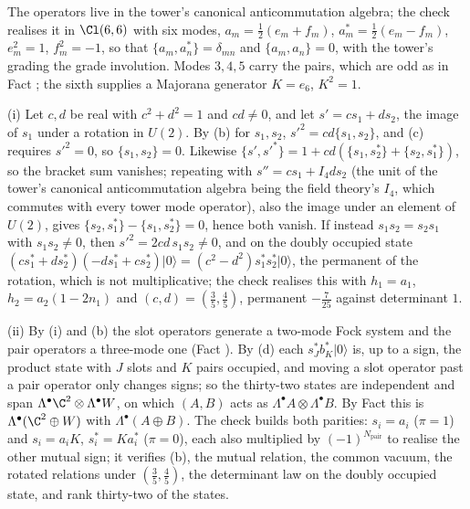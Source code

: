 The operators live in the tower's canonical anticommutation algebra; the check realises it in $\Cl(6,6)$ with six modes, $a_{m} = \tfrac12(e_{m} + f_{m})$, $a_{m}^{*} = \tfrac12(e_{m} - f_{m})$, $e_{m}^{2} = 1$, $f_{m}^{2} = -1$, so that $\{a_{m}, a_{n}^{*}\} = \delta_{mn}$ and $\{a_{m}, a_{n}\} = 0$, with the tower's grading the grade involution. Modes $3, 4, 5$ carry the pairs, which are odd as in Fact ; the sixth supplies a Majorana generator $K = e_{6}$, $K^{2} = 1$.

(i) Let $c, d$ be real with $c^{2} + d^{2} = 1$ and $cd \ne 0$, and let $s' = cs_{1} + ds_{2}$, the image of $s_{1}$ under a rotation in $U(2)$. By (b) for $s_{1}, s_{2}$, $s'^{2} = cd\{s_{1}, s_{2}\}$, and (c) requires $s'^{2} = 0$, so $\{s_{1}, s_{2}\} = 0$. Likewise $\{s', s'^{*}\} = 1 + cd(\{s_{1}, s_{2}^{*}\} + \{s_{2}, s_{1}^{*}\})$, so the bracket sum vanishes; repeating with $s'' = cs_{1} + I_{4} d s_{2}$ (the unit of the tower's canonical anticommutation algebra being the field theory's $I_{4}$, which commutes with every tower mode operator), also the image under an element of $U(2)$, gives $\{s_{2}, s_{1}^{*}\} - \{s_{1}, s_{2}^{*}\} = 0$, hence both vanish. If instead $s_{1}s_{2} = s_{2}s_{1}$ with $s_{1}s_{2} \neq 0$, then $s'^{2} = 2cd\,s_{1}s_{2} \neq 0$, and on the doubly occupied state $(cs_{1}^{*} + ds_{2}^{*})(-ds_{1}^{*} + cs_{2}^{*})\lvert 0 \rangle = (c^{2} - d^{2})s_{1}^{*}s_{2}^{*}\lvert 0 \rangle$, the permanent of the rotation, which is not multiplicative; the check realises this with $h_{1} = a_{1}$, $h_{2} = a_{2}(1 - 2n_{1})$ and $(c, d) = (\tfrac35, \tfrac45)$, permanent $-\tfrac{7}{25}$ against determinant $1$.

(ii) By (i) and (b) the slot operators generate a two-mode Fock system and the pair operators a three-mode one (Fact ). By (d) each $s_{J}^{*}b_{K}^{*}\lvert 0 \rangle$ is, up to a sign, the product state with $J$ slots and $K$ pairs occupied, and moving a slot operator past a pair operator only changes signs; so the thirty-two states are independent and span $\Lambda^{\bullet}\C^{2} \otimes \Lambda^{\bullet}W$, on which $(A, B)$ acts as $\Lambda^{\bullet}A \otimes \Lambda^{\bullet}B$. By Fact  this is $\Lambda^{\bullet}(\C^{2} \oplus W)$ with $\Lambda^{\bullet}(A \oplus B)$. The check builds both parities: $s_{i} = a_{i}$ ($\pi = 1$) and $s_{i} = a_{i}K$, $s_{i}^{*} = Ka_{i}^{*}$ ($\pi = 0$), each also multiplied by $(-1)^{N_{\mathrm{pair}}}$ to realise the other mutual sign; it verifies (b), the mutual relation, the common vacuum, the rotated relations under $(\tfrac35, \tfrac45)$, the determinant law on the doubly occupied state, and rank thirty-two of the states.

